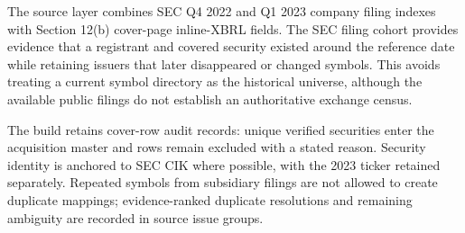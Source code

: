 
The source layer combines SEC Q4 2022 and Q1 2023 company filing indexes with Section 12(b) cover-page inline-XBRL fields. The SEC filing cohort provides evidence that a registrant and covered security existed around the reference date while retaining issuers that later disappeared or changed symbols. This avoids treating a current symbol directory as the historical universe, although the available public filings do not establish an authoritative exchange census.

The build retains \AuditRows{} cover-row audit records: \IncludedSecurities{} unique verified securities enter the acquisition master and \ExcludedAuditRows{} rows remain excluded with a stated reason. Security identity is anchored to SEC CIK where possible, with the 2023 ticker retained separately. Repeated symbols from subsidiary filings are not allowed to create duplicate mappings; evidence-ranked duplicate resolutions and remaining ambiguity are recorded in \UniverseIssues{} source issue groups.
